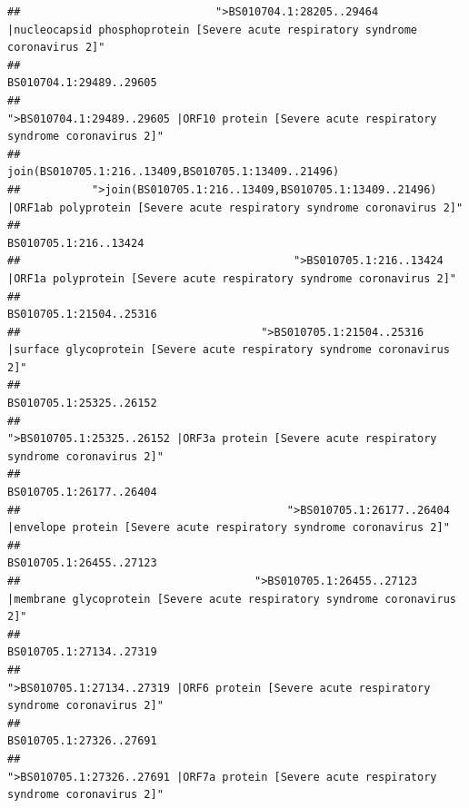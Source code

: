 \documentclass[
]{article}
\begin{document}
\begin{verbatim}
##                              ">BS010704.1:28205..29464 |nucleocapsid phosphoprotein [Severe acute respiratory syndrome coronavirus 2]" 
##                                                                                                                BS010704.1:29489..29605 
##                                            ">BS010704.1:29489..29605 |ORF10 protein [Severe acute respiratory syndrome coronavirus 2]" 
##                                                                                    join(BS010705.1:216..13409,BS010705.1:13409..21496) 
##           ">join(BS010705.1:216..13409,BS010705.1:13409..21496) |ORF1ab polyprotein [Severe acute respiratory syndrome coronavirus 2]" 
##                                                                                                                  BS010705.1:216..13424 
##                                          ">BS010705.1:216..13424 |ORF1a polyprotein [Severe acute respiratory syndrome coronavirus 2]" 
##                                                                                                                BS010705.1:21504..25316 
##                                     ">BS010705.1:21504..25316 |surface glycoprotein [Severe acute respiratory syndrome coronavirus 2]" 
##                                                                                                                BS010705.1:25325..26152 
##                                            ">BS010705.1:25325..26152 |ORF3a protein [Severe acute respiratory syndrome coronavirus 2]" 
##                                                                                                                BS010705.1:26177..26404 
##                                         ">BS010705.1:26177..26404 |envelope protein [Severe acute respiratory syndrome coronavirus 2]" 
##                                                                                                                BS010705.1:26455..27123 
##                                    ">BS010705.1:26455..27123 |membrane glycoprotein [Severe acute respiratory syndrome coronavirus 2]" 
##                                                                                                                BS010705.1:27134..27319 
##                                             ">BS010705.1:27134..27319 |ORF6 protein [Severe acute respiratory syndrome coronavirus 2]" 
##                                                                                                                BS010705.1:27326..27691 
##                                            ">BS010705.1:27326..27691 |ORF7a protein [Severe acute respiratory syndrome coronavirus 2]" 

\end{verbatim}
\end{document}
